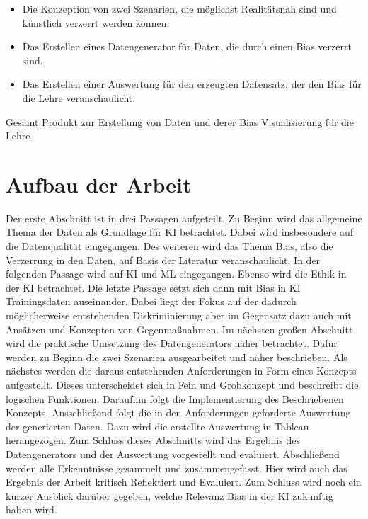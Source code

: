 \begin{onehalfspace}
        \begin{itemize}
            \item Die Konzeption von zwei Szenarien, die möglichst Realitätsnah sind und künstlich verzerrt werden können.
            \item Das Erstellen eines Datengenerator für Daten, die durch einen Bias verzerrt sind.
            \item Das Erstellen einer Auswertung für den erzeugten Datensatz, der den Bias für die Lehre veranschaulicht.
        \end{itemize}

        Gesamt Produkt zur Erstellung von Daten und derer Bias Visualisierung für die Lehre \\

        \newpage
        \section{Aufbau der Arbeit}
        \label{subsec:aufbau der arbeit}
        Der erste Abschnitt ist in drei Passagen aufgeteilt. Zu Beginn wird das allgemeine Thema der Daten als Grundlage für \ac*{KI} betrachtet. Dabei wird insbesondere auf die Datenqualität eingegangen. Des weiteren wird das Thema Bias, also die Verzerrung in den Daten, auf Basis der Literatur veranschaulicht. In der folgenden Passage wird auf \ac*{KI} und \ac{ML} eingegangen. Ebenso wird die Ethik in der \ac*{KI} betrachtet. Die letzte Passage setzt sich dann mit Bias in \ac*{KI} Trainingsdaten auseinander. Dabei liegt der Fokus auf der dadurch möglicherweise entstehenden Diskriminierung aber im Gegensatz dazu auch mit Ansätzen und Konzepten von Gegenmaßnahmen.
        Im nächsten großen Abschnitt wird die praktische Umsetzung des Datengenerators näher betrachtet. Dafür werden zu Beginn die zwei Szenarien ausgearbeitet und näher beschrieben. Als nächstes werden die daraus entstehenden Anforderungen in Form eines Konzepts aufgestellt. Dieses unterscheidet sich in Fein und Grobkonzept und beschreibt die logischen Funktionen. Daraufhin folgt die Implementierung des Beschriebenen Konzepts. Ansschließend folgt die in den Anforderungen geforderte Auswertung der generierten Daten. Dazu wird die erstellte Auswertung in Tableau herangezogen. Zum Schluss dieses Abschnitts wird das Ergebnis des Datengenerators und der Auswertung vorgestellt und evaluiert.
        Abschließend werden alle Erkenntnisse gesammelt und zusammengefasst. Hier wird auch das Ergebnis der Arbeit kritisch Reflektiert und Evaluiert. Zum Schluss wird noch ein kurzer Ausblick darüber gegeben, welche Relevanz Bias in der \ac*{KI} zukünftig haben wird. 
        
        \newpage
    \end{onehalfspace}